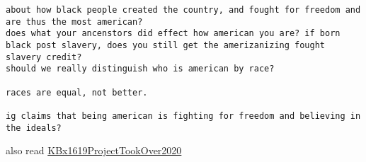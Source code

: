 \documentclass[letterpaper]{article}
\begin{document}
\begin{verbatim}
about how black people created the country, and fought for freedom and are thus the most american? 
does what your ancenstors did effect how american you are? if born black post slavery, does you still get the amerizanizing fought slavery credit? 
should we really distinguish who is american by race?

races are equal, not better.

ig claims that being american is fighting for freedom and believing in the ideals?
\end{verbatim}

also read
\href{KBx1619ProjectTookOver2020.org}{KBx1619ProjectTookOver2020}
\end{document}
